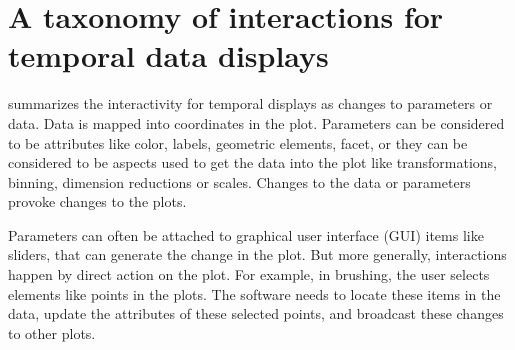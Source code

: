 \documentclass[12pt]{article}
\providecommand{\tabularnewline}{\\}
\begin{document}
%



\section{A taxonomy of interactions for temporal data displays\label{sec:Design-of-interactions}}

\citet{wills2012visualizing} summarizes
the interactivity for temporal displays as changes to parameters or data. Data is mapped into coordinates in the plot. Parameters can be considered to be attributes like color, labels, geometric elements, facet, or they can be considered to be aspects used to get the data into the plot like transformations, binning, dimension reductions or scales. Changes to the data or parameters provoke changes to the plots.

Parameters can often be attached to graphical user interface (GUI) items like sliders, that can generate the change in the plot. But more generally, interactions happen by direct action on the plot. For example, in brushing, the user selects elements like points in the plots. The software needs to locate these items in the data, update the attributes of these selected points, and broadcast these changes to other plots.
\end{document}
